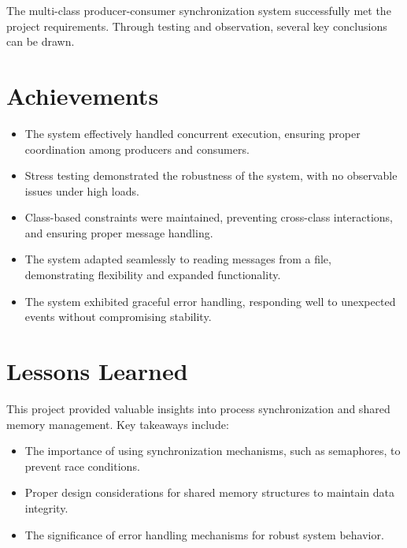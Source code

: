The multi-class producer-consumer synchronization system successfully met the project requirements. Through testing and observation, several key conclusions can be drawn.

\section{Achievements}

\begin{itemize}
    \item The system effectively handled concurrent execution, ensuring proper coordination among producers and consumers.
    \item Stress testing demonstrated the robustness of the system, with no observable issues under high loads.
    \item Class-based constraints were maintained, preventing cross-class interactions, and ensuring proper message handling.
    \item The system adapted seamlessly to reading messages from a file, demonstrating flexibility and expanded functionality.
    \item The system exhibited graceful error handling, responding well to unexpected events without compromising stability.
\end{itemize}

\section{Lessons Learned}

This project provided valuable insights into process synchronization and shared memory management. Key takeaways include:

\begin{itemize}
    \item The importance of using synchronization mechanisms, such as semaphores, to prevent race conditions.
    \item Proper design considerations for shared memory structures to maintain data integrity.
    \item The significance of error handling mechanisms for robust system behavior.
\end{itemize}
